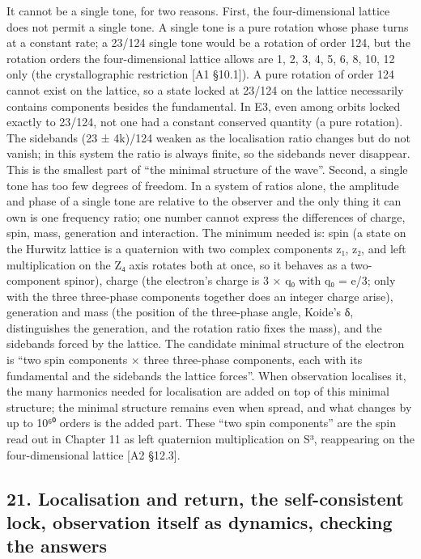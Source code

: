 \documentclass[
  a4paper,
]{article}
\begin{document}
It cannot be a single tone, for two reasons. First, the four-dimensional
lattice does not permit a single tone. A single tone is a pure rotation
whose phase turns at a constant rate; a 23/124 single tone would be a
rotation of order 124, but the rotation orders the four-dimensional
lattice allows are 1, 2, 3, 4, 5, 6, 8, 10, 12 only (the
crystallographic restriction {[}A1 §10.1{]}). A pure rotation of order
124 cannot exist on the lattice, so a state locked at 23/124 on the
lattice necessarily contains components besides the fundamental. In E3,
even among orbits locked exactly to 23/124, not one had a constant
conserved quantity (a pure rotation). The sidebands (23 ± 4k)/124 weaken
as the localisation ratio changes but do not vanish; in this system the
ratio is always finite, so the sidebands never disappear. This is the
smallest part of ``the minimal structure of the wave''. Second, a single
tone has too few degrees of freedom. In a system of ratios alone, the
amplitude and phase of a single tone are relative to the observer and
the only thing it can own is one frequency ratio; one number cannot
express the differences of charge, spin, mass, generation and
interaction. The minimum needed is: spin (a state on the Hurwitz lattice
is a quaternion with two complex components z₁, z₂, and left
multiplication on the Z₄ axis rotates both at once, so it behaves as a
two-component spinor), charge (the electron's charge is 3 × q₀ with q₀ =
e/3; only with the three three-phase components together does an integer
charge arise), generation and mass (the position of the three-phase
angle, Koide's δ, distinguishes the generation, and the rotation ratio
fixes the mass), and the sidebands forced by the lattice. The candidate
minimal structure of the electron is ``two spin components × three
three-phase components, each with its fundamental and the sidebands the
lattice forces''. When observation localises it, the many harmonics
needed for localisation are added on top of this minimal structure; the
minimal structure remains even when spread, and what changes by up to
10⁶⁰ orders is the added part. These ``two spin components'' are the
spin read out in Chapter 11 as left quaternion multiplication on S³,
reappearing on the four-dimensional lattice {[}A2 §12.3{]}.

\subsection{21. Localisation and return, the self-consistent lock,
observation itself as dynamics, checking the
answers}\label{localisation-and-return-the-self-consistent-lock-observation-itself-as-dynamics-checking-the-answers}
\end{document}
